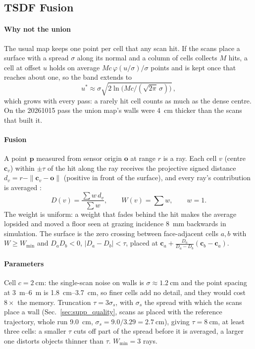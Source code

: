 \subsection{TSDF Fusion}
\paragraph{Why not the union} The usual map keeps one point per cell that
any scan hit. If the scans place a surface with a spread $\sigma$ along its
normal and a column of cells collects $M$ hits, a cell at offset $u$ holds
on average $M c\,\varphi(u/\sigma)/\sigma$ points and is kept once that
reaches about one, so the band extends to
\begin{equation}
u^\ast\approx\sigma\sqrt{2\ln\!\big(Mc/(\sqrt{2\pi}\,\sigma)\big)}\, ,
\end{equation}
which grows with every pass: a rarely hit cell counts as much as the dense
centre. On the 20261015 pass the union map's walls were
\SI{4}{\centi\metre} thicker than the scans that built it.

\paragraph{Fusion} A point $\mathbf p$ measured from sensor origin
$\mathbf o$ at range $r$ is a ray. Each cell $v$ (centre $\mathbf c_v$)
within $\pm\tau$ of the hit along the ray receives the projective signed
distance $d_v=r-\|\mathbf c_v-\mathbf o\|$ (positive in front of the
surface), and every ray's contribution is averaged
\cite{curless1996,vdbfusion}:
\begin{equation}
D(v)=\frac{\sum w\,d_v}{\sum w},\qquad W(v)=\sum w,\qquad w=1 .
\end{equation}
The weight is uniform: a weight that fades behind the hit makes the average
lopsided and moved a floor seen at grazing incidence \SI{8}{\milli\metre}
backwards in simulation. The surface is the zero crossing between
face-adjacent cells $a,b$ with $W\ge W_{\min}$ and $D_aD_b<0$,
$|D_a-D_b|<\tau$, placed at
$\mathbf c_a+\tfrac{D_a}{D_a-D_b}(\mathbf c_b-\mathbf c_a)$.

\paragraph{Parameters} Cell $c=\SI{2}{\centi\metre}$: the single-scan noise
on walls is $\sigma\approx\SI{1.2}{\centi\metre}$ and the point spacing at
\SIrange{3}{6}{\metre} is \SIrange{1.8}{3.7}{\centi\metre}, so finer cells
add no detail, and they would cost $8\times$ the memory. Truncation
$\tau=3\sigma_s$, with $\sigma_s$ the spread with which the scans place a
wall (Sec.~\ref{sec:supp_quality}, scans as placed with the reference
trajectory, whole run \SI{9.0}{\centi\metre},
$\sigma_s=9.0/3.29=\SI{2.7}{\centi\metre}$), giving
$\tau=\SI{8}{\centi\metre}$, at least three cells: a smaller
$\tau$ cuts off part of the spread before it is averaged, a larger one
distorts objects thinner than $\tau$. $W_{\min}=3$ rays.

